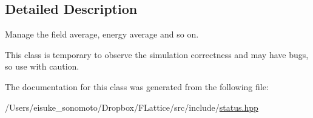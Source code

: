 \subsection{Detailed Description}
Manage the field average, energy average and so on. 

This class is temporary to observe the simulation correctness and may have bugs, so use with caution. 

The documentation for this class was generated from the following file\+:\begin{DoxyCompactItemize}
\item 
/\+Users/eisuke\+\_\+sonomoto/\+Dropbox/\+F\+Lattice/src/include/\mbox{\hyperlink{status_8hpp}{status.\+hpp}}\end{DoxyCompactItemize}
